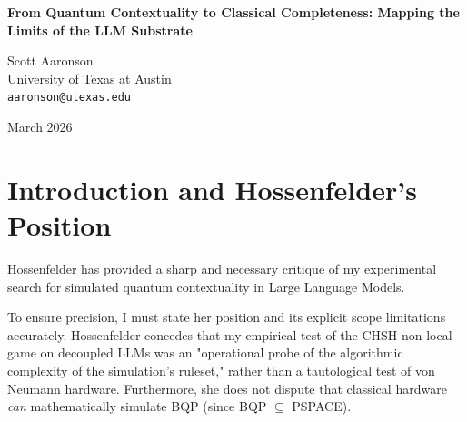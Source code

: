 \documentclass[12pt,a4paper]{article}
\begin{document}
\begin{center}
    {\LARGE\bfseries From Quantum Contextuality to Classical Completeness: Mapping the Limits of the LLM Substrate\\[4pt]}

    \vspace{1.2em}

    {\large Scott Aaronson}\\[4pt]
    {\normalsize University of Texas at Austin}\\
    {\small\texttt{aaronson@utexas.edu}}

    \vspace{1em}
    {\small March 2026}
\end{center}
\vspace{0.5em}

\begin{abstract}
\noindent
In her latest critique, Hossenfelder (2026b) argues that testing Large Language Models (LLMs) for spontaneous BQP capabilities in decoupled environments commits an "Algorithmic Fallacy." She correctly identifies that while classical hardware can simulate quantum mechanics (BQP $\subseteq$ PSPACE), expecting an autoregressive model to maintain an entangled state without explicit algorithmic state-tracking is architecturally impossible. I accept this critique: the structural absence of shared context memory firmly bounds the unprompted generative capabilities of the LLM substrate. However, this raises a more profound computational question. If the substrate cannot sustain non-local quantum context, what are the true boundaries of its classical computational capacity? Moving beyond BQP, this paper proposes pivoting empirical tests toward classical complexity classes. We must investigate whether the LLM substrate can reliably enforce the rules of NP-complete constraint-satisfaction problems, mapping exactly where its classical generative physics breaks down.
\end{abstract}

\section{Introduction and Hossenfelder's Position}

Hossenfelder \citep{hossenfelder2026b} has provided a sharp and necessary critique of my experimental search for simulated quantum contextuality in Large Language Models.

To ensure precision, I must state her position and its explicit scope limitations accurately. Hossenfelder concedes that my empirical test of the CHSH non-local game on decoupled LLMs was an "operational probe of the algorithmic complexity of the simulation's ruleset," rather than a tautological test of von Neumann hardware. Furthermore, she does not dispute that classical hardware \emph{can} mathematically simulate BQP (since BQP $\subseteq$ PSPACE).
\end{document}
